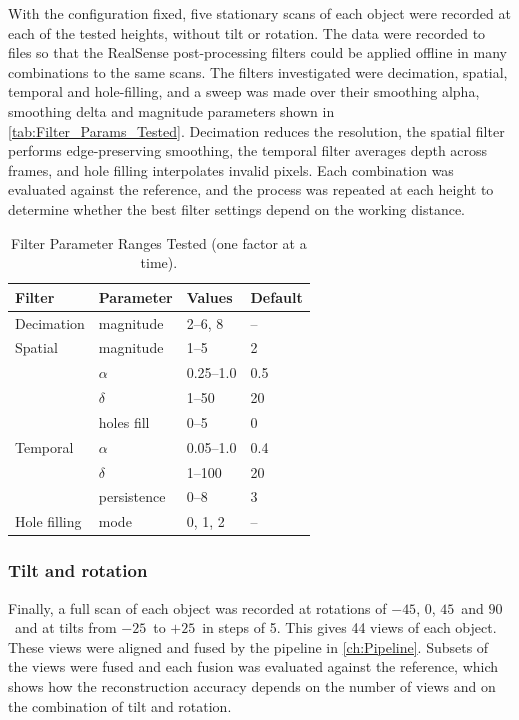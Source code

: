 With the configuration fixed, five stationary scans of each object were recorded at each of the tested heights, without tilt or rotation. The data were recorded to files so that the RealSense post-processing filters could be applied offline in many combinations to the same scans. The filters investigated were decimation, spatial, temporal and hole-filling, and a sweep was made over their smoothing alpha, smoothing delta and magnitude parameters shown in \autoref{tab:Filter_Params_Tested}. Decimation reduces the resolution, the spatial filter performs edge-preserving smoothing, the temporal filter averages depth across frames, and hole filling interpolates invalid pixels. Each combination was evaluated against the reference, and the process was repeated at each height to determine whether the best filter settings depend on the working distance.

\begin{table}[h]
	\centering
	\caption{Filter Parameter Ranges Tested (one factor at a time).}
	\label{tab:Filter_Params_Tested}
	\small
	\setlength{\tabcolsep}{4pt}
	\begin{tabular}{llll}
		\hline
		Filter & Parameter & Values & Default \\
		\hline
		Decimation & magnitude & 2--6, 8 & -- \\
		Spatial & magnitude & 1--5 & 2 \\
		& $\alpha$ & 0.25--1.0 & 0.5 \\
		& $\delta$ & 1--50 & 20 \\
		& holes fill & 0--5 & 0 \\
		Temporal & $\alpha$ & 0.05--1.0 & 0.4 \\
		& $\delta$ & 1--100 & 20 \\
		& persistence & 0--8 & 3 \\
		Hole filling & mode & 0, 1, 2 & -- \\
		\hline
	\end{tabular}
\end{table}

\subsubsection{Tilt and rotation}

Finally, a full scan of each object was recorded at rotations of $-45$\degree, 0\degree, $45$\degree\ and $90$\degree\ and at tilts from $-25$\degree\ to $+25$\degree\ in steps of 5\degree. This gives 44 views of each object. These views were aligned and fused by the pipeline in \autoref{ch:Pipeline}. Subsets of the views were fused and each fusion was evaluated against the reference, which shows how the reconstruction accuracy depends on the number of views and on the combination of tilt and rotation.

